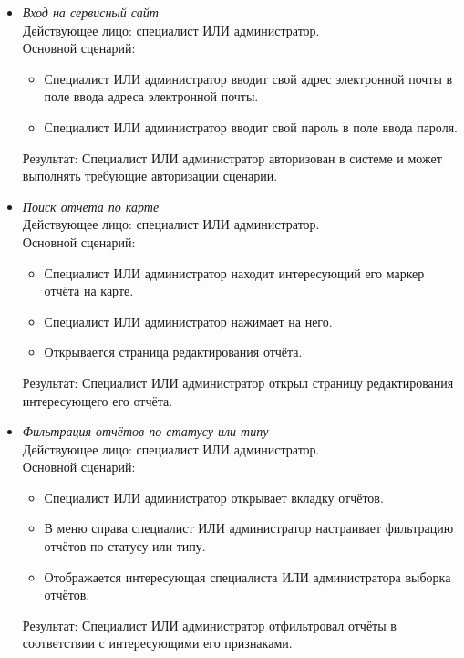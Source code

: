 \begin{itemize}[topsep=0pt, parsep=0pt, itemsep=0pt, leftmargin=*, labelindent=0.5cm]
	\item \textit{Вход на сервисный сайт} \\
	Действующее лицо: специалист ИЛИ администратор. \\
	Основной сценарий:
	\begin{itemize}[topsep=0pt, parsep=0pt, itemsep=0pt, leftmargin=*, labelindent=0.5cm]
		\item Специалист ИЛИ администратор вводит свой адрес электронной почты в поле ввода адреса электронной почты.
		\item Специалист ИЛИ администратор вводит свой пароль в поле ввода пароля.
	\end{itemize}
	Результат: Специалист ИЛИ администратор авторизован в системе и может выполнять требующие авторизации сценарии.
\end{itemize}

\begin{itemize}[topsep=0pt, parsep=0pt, itemsep=0pt, leftmargin=*, labelindent=0.5cm]
	\item \textit{Поиск отчета по карте} \\
	Действующее лицо: специалист ИЛИ администратор. \\
	Основной сценарий:
	\begin{itemize}[topsep=0pt, parsep=0pt, itemsep=0pt, leftmargin=*, labelindent=0.5cm]
		\item Специалист ИЛИ администратор находит интересующий его маркер отчёта на карте.
		\item Специалист ИЛИ администратор нажимает на него.
		\item Открывается страница редактирования отчёта.
	\end{itemize}
	Результат: Специалист ИЛИ администратор открыл страницу редактирования интересующего его отчёта.
\end{itemize}

\begin{itemize}[topsep=0pt, parsep=0pt, itemsep=0pt, leftmargin=*, labelindent=0.5cm]
	\item \textit{Фильтрация отчётов по статусу или типу} \\
	Действующее лицо: специалист ИЛИ администратор. \\
	Основной сценарий:
	\begin{itemize}[topsep=0pt, parsep=0pt, itemsep=0pt, leftmargin=*, labelindent=0.5cm]
		\item Специалист ИЛИ администратор открывает вкладку отчётов.
		\item В меню справа специалист ИЛИ администратор настраивает фильтрацию отчётов по статусу или типу.
		\item Отображается интересующая специалиста ИЛИ администратора выборка отчётов.
	\end{itemize}
	Результат: Специалист ИЛИ администратор отфильтровал отчёты в соответствии с интересующими его признаками.
\end{itemize}

